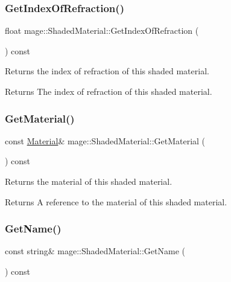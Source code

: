 \subsubsection{\texorpdfstring{Get\+Index\+Of\+Refraction()}{GetIndexOfRefraction()}}
{\footnotesize\ttfamily float mage\+::\+Shaded\+Material\+::\+Get\+Index\+Of\+Refraction (\begin{DoxyParamCaption}{ }\end{DoxyParamCaption}) const\hspace{0.3cm}{\ttfamily [noexcept]}}

Returns the index of refraction of this shaded material.

\begin{DoxyReturn}{Returns}
The index of refraction of this shaded material. 
\end{DoxyReturn}
\hypertarget{structmage_1_1_shaded_material_a4de9a6fe5389da19cbe3e5b073622374}{}\label{structmage_1_1_shaded_material_a4de9a6fe5389da19cbe3e5b073622374} 
\subsubsection{\texorpdfstring{Get\+Material()}{GetMaterial()}}
{\footnotesize\ttfamily const \hyperlink{structmage_1_1_material}{Material}\& mage\+::\+Shaded\+Material\+::\+Get\+Material (\begin{DoxyParamCaption}{ }\end{DoxyParamCaption}) const\hspace{0.3cm}{\ttfamily [noexcept]}}

Returns the material of this shaded material.

\begin{DoxyReturn}{Returns}
A reference to the material of this shaded material. 
\end{DoxyReturn}
\hypertarget{structmage_1_1_shaded_material_af7be0282cc547159cd733475f63eb982}{}\label{structmage_1_1_shaded_material_af7be0282cc547159cd733475f63eb982} 
\subsubsection{\texorpdfstring{Get\+Name()}{GetName()}}
{\footnotesize\ttfamily const string\& mage\+::\+Shaded\+Material\+::\+Get\+Name (\begin{DoxyParamCaption}{ }\end{DoxyParamCaption}) const\hspace{0.3cm}{\ttfamily [noexcept]}}

